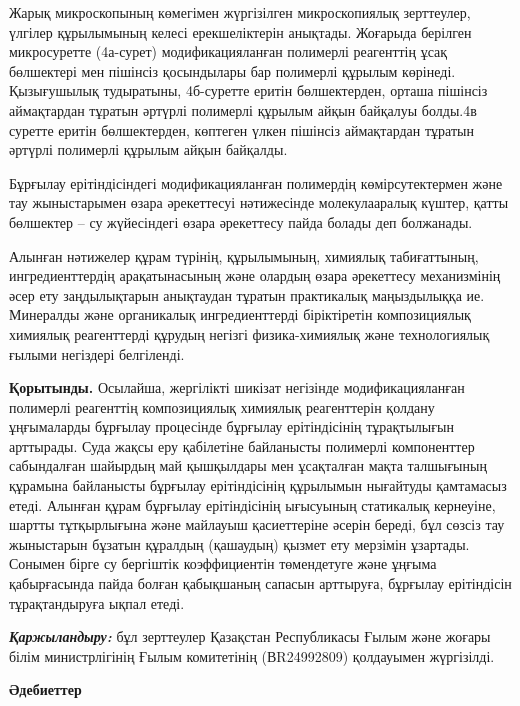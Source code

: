 \begin{multicols}{2}
Жарық микроскопының көмегімен жүргізілген микроскопиялық зерттеулер,
үлгілер құрылымының келесі ерекшеліктерін анықтады. Жоғарыда берілген
микросуретте (4а-сурет) модификацияланған полимерлі реагенттің ұсақ
бөлшектері мен пішінсіз қосындылары бар полимерлі құрылым көрінеді.
Қызығушылық тудыратыны, 4б-суретте еритін бөлшектерден, орташа пішінсіз
аймақтардан тұратын әртүрлі полимерлі құрылым айқын байқалуы болды.4в
суретте еритін бөлшектерден, көптеген үлкен пішінсіз аймақтардан тұратын
әртүрлі полимерлі құрылым айқын байқалды.

Бұрғылау ерітіндісіндегі модификацияланған полимердің көмірсутектермен
және тау жыныстарымен өзара әрекеттесуі нәтижесінде молекулааралық
күштер, қатты бөлшектер -- су жүйесіндегі өзара әрекеттесу пайда болады
деп болжанады.

Алынған нәтижелер құрам түрінің, құрылымының, химиялық табиғаттының,
ингредиенттердің арақатынасының және олардың өзара әрекеттесу
механизмінің әсер ету заңдылықтарын анықтаудан тұратын практикалық
маңыздылыққа ие. Минералды және органикалық ингредиенттерді біріктіретін
композициялық химиялық реагенттерді құрудың негізгі физика-химиялық және
технологиялық ғылыми негіздері белгіленді.

{\bfseries Қорытынды.} Осылайша, жергілікті шикізат негізінде
модификацияланған полимерлі реагенттің композициялық химиялық
реагенттерін қолдану ұңғымаларды бұрғылау процесінде бұрғылау
ерітіндісінің тұрақтылығын арттырады. Суда жақсы еру қабілетіне
байланысты полимерлі компоненттер сабындалған шайырдың май қышқылдары
мен ұсақталған мақта талшығының құрамына байланысты бұрғылау
ерітіндісінің құрылымын нығайтуды қамтамасыз етеді. Алынған құрам
бұрғылау ерітіндісінің ығысуының статикалық кернеуіне, шартты
тұтқырлығына және майлауыш қасиеттеріне әсерін береді, бұл сөзсіз тау
жыныстарын бұзатын құралдың (қашаудың) қызмет ету мерзімін ұзартады.
Сонымен бірге су бергіштік коэффициентін төмендетуге және ұңғыма
қабырғасында пайда болған қабықшаның сапасын арттыруға, бұрғылау
ерітіндісін тұрақтандыруға ықпал етеді.

\emph{{\bfseries Қаржыландыру:}} бұл зерттеулер Қазақстан Республикасы
Ғылым және жоғары білім министрлігінің Ғылым комитетінің (ВR24992809)
қолдауымен жүргізілді.
\end{multicols}

\begin{center}
{\bfseries Әдебиеттер}
\end{center}

